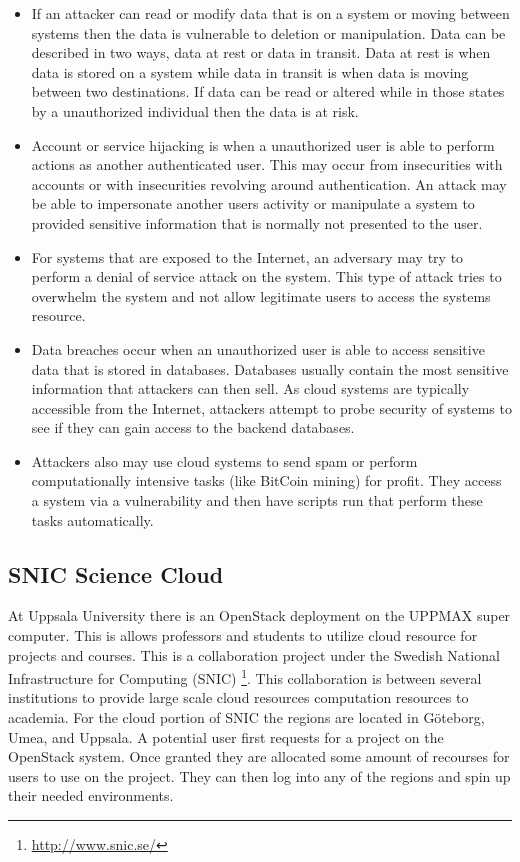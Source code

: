 \documentclass[12pt]{article}
\begin{document}
\begin{itemize}
    \item If an attacker can read or modify data that is on a system or moving between systems then the data is vulnerable to deletion or manipulation.  Data can be described in two ways, data at rest or data in transit. Data at rest is when data is stored on a system while data in transit is when data is moving between two destinations. If data can be read or altered while in those states by a unauthorized individual then the data is at risk.
    \item Account or service hijacking is when a unauthorized user is able to perform actions as another authenticated user. This may occur from insecurities with accounts or with insecurities revolving around authentication. An attack may be able to impersonate another users activity or manipulate a system to provided sensitive information that is normally not presented to the user.
    \item For systems that are exposed to the Internet, an adversary may try to perform a denial of service attack on the system. This type of attack tries to overwhelm the system and not allow legitimate users to access the systems resource.
    \item Data breaches occur when an unauthorized user is able to access sensitive data that is stored in databases. Databases usually contain the most sensitive information that attackers can then sell. As cloud systems are typically accessible from the Internet, attackers attempt to probe security of systems to see if they can gain access to the backend databases.
    \item Attackers also may use cloud systems to send spam or perform computationally intensive tasks (like BitCoin mining) for profit. They access a system via a vulnerability and then have scripts run that perform these tasks automatically.
\end{itemize}

\subsection{SNIC Science Cloud}
At Uppsala University there is an OpenStack deployment on the UPPMAX super computer. This is allows professors and students to utilize cloud resource for projects and courses.  This is a collaboration project under the Swedish National Infrastructure for Computing (SNIC) \footnote{\href{http://www.snic.se/}{http://www.snic.se/}}.  This collaboration is between several institutions to provide large scale cloud resources computation resources to academia. For the  cloud portion of SNIC the regions are located in Göteborg, Umea, and Uppsala. A potential user first requests for a project on the OpenStack system. Once granted they are allocated some amount of recourses for users to use on the project. They can then log into any of the regions and spin up their needed environments.
\end{document}
